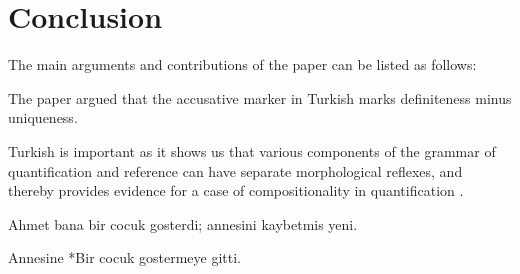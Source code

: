 \documentclass[11pt,a4paper]{article}
\begin{document}
\section{Conclusion}
\label{scconc}

The main arguments and contributions of the paper can be listed as
follows:


The paper argued that the accusative marker in Turkish marks definiteness minus
uniqueness.

Turkish is important as it shows us that various components of the grammar of quantification and reference can have separate morphological reflexes, and thereby provides evidence for a case of compositionality in quantification .














Ahmet bana bir cocuk gosterdi; annesini kaybetmis yeni. 

Annesine *Bir cocuk gostermeye gitti.

\end{document}
